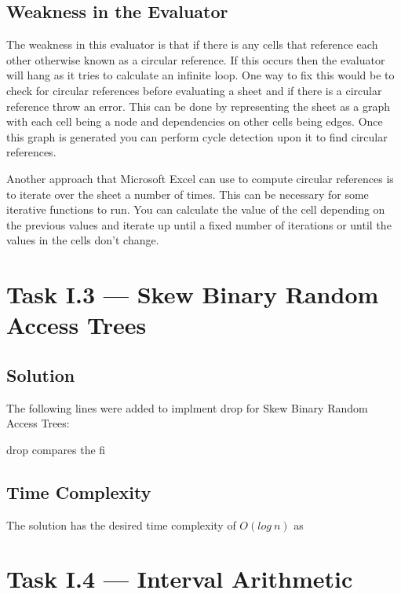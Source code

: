 \documentclass[a4paper]{article}
\begin{document}
\subsection{Weakness in the Evaluator}
The weakness in this evaluator is that if there is any cells that reference each other otherwise known as a circular reference.
If this occurs then the evaluator will hang as it tries to calculate an infinite loop.
One way to fix this would be to check for circular references before evaluating a sheet and if there is a circular reference throw an error.
This can be done by representing the sheet as a graph with each cell being a node and dependencies on other cells being edges.
Once this graph is generated you can perform cycle detection upon it to find circular references.
\par
Another approach that Microsoft Excel can use to compute circular references is to iterate over the sheet a number of times.
This can be necessary for some iterative functions to run.
You can calculate the value of the cell depending on the previous values and iterate up until a fixed number of iterations or until the values in the cells don't change.

\section{Task I.3 --- Skew Binary Random Access Trees}
\subsection{Solution}
The following lines were added to implment drop for Skew Binary Random Access Trees:

\par
drop compares the fi

\subsection{Time Complexity}
The solution has the desired time complexity of \( O(log\ n) \) as

\section{Task I.4 --- Interval Arithmetic}





% 
\end{document}
